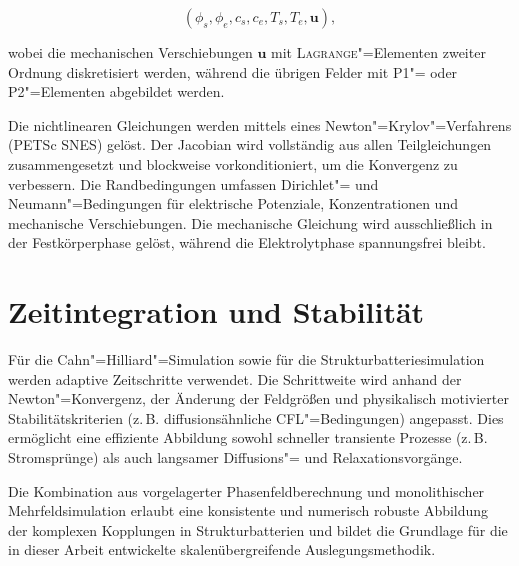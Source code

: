 \[
(\phi_s, \phi_e, c_s, c_e, T_s, T_e, \boldsymbol{u}),
\]


wobei die mechanischen Verschiebungen $\boldsymbol{u}$ mit \textsc{Lagrange}"=Elementen zweiter Ordnung diskretisiert werden, während die übrigen Felder mit P1"= oder P2"=Elementen abgebildet werden.

Die nichtlinearen Gleichungen werden mittels eines Newton"=Krylov"=Verfahrens (PETSc SNES) gelöst. Der Jacobian wird vollständig aus allen Teilgleichungen zusammengesetzt und blockweise vorkonditioniert, um die Konvergenz zu verbessern. Die Randbedingungen umfassen Dirichlet"= und Neumann"=Bedingungen für elektrische Potenziale, Konzentrationen und mechanische Verschiebungen. Die mechanische Gleichung wird ausschließlich in der Festkörperphase gelöst, während die Elektrolytphase spannungsfrei bleibt.

\section{Zeitintegration und Stabilität}

Für die Cahn"=Hilliard"=Simulation sowie für die Strukturbatteriesimulation werden adaptive Zeitschritte verwendet. Die Schrittweite wird anhand der Newton"=Konvergenz, der Änderung der Feldgrößen und physikalisch motivierter Stabilitätskriterien (z.\,B. diffusionsähnliche CFL"=Bedingungen) angepasst. Dies ermöglicht eine effiziente Abbildung sowohl schneller transiente Prozesse (z.\,B. Stromsprünge) als auch langsamer Diffusions"= und Relaxationsvorgänge.

Die Kombination aus vorgelagerter Phasenfeldberechnung und monolithischer Mehrfeldsimulation erlaubt eine konsistente und numerisch robuste Abbildung der komplexen Kopplungen in Strukturbatterien und bildet die Grundlage für die in dieser Arbeit entwickelte skalenübergreifende Auslegungsmethodik.
